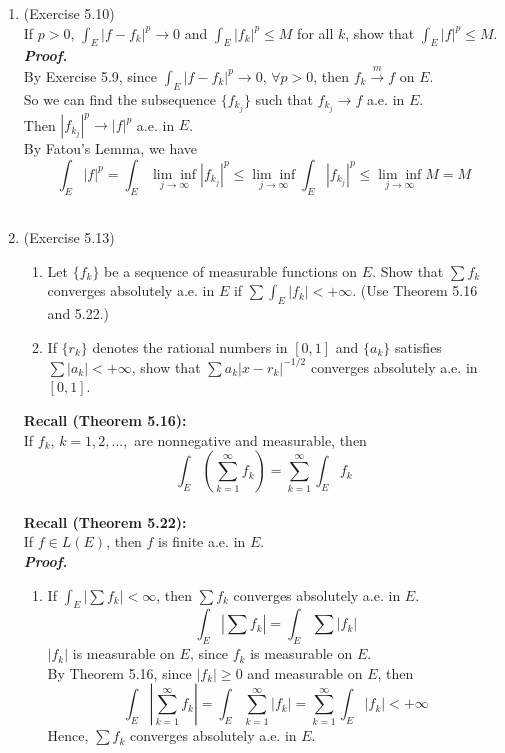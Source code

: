 \documentclass[a4paper,11pt]{article}
\begin{document}
\begin{enumerate}
\item (Exercise 5.10)\\
 If $p > 0$, $\int_{E} |f - f_k|^p \to 0$ and $\int_{E} |f_k|^p \leq M$ for all $k$, show that $\int_{E} |f|^p \leq M$.\\
 \newline
 \textit{\textbf {Proof.}}\\
 By Exercise 5.9, since $\int_{E} |f - f_k|^p \to 0$, $\forall p>0$, then $f_k \overset{m}{\to} f$ on $E$.\\
 So we can find the subsequence $\{ f_{k_j} \}$ such that $f_{k_j} \to f$ a.e. in $E$.\\
 Then $|f_{k_j}|^p \to |f|^p$ a.e. in $E$.\\
 By Fatou's Lemma, we have
 $$\int_{E} |f|^p = \int_{E} \underset{j \to \infty}{\lim \inf} |f_{k_j}|^p \leq \underset{j \to \infty}{\lim \inf} \int_{E} |f_{k_j}|^p \leq \underset{j \to \infty}{\lim \inf} M = M$$\\








\item (Exercise 5.13)
 \begin{enumerate}
 \item Let $\{ f_k \}$ be a sequence of measurable functions on $E$. Show that $\sum f_k$ converges absolutely a.e. in $E$ if $\sum \int_{E} |f_k| < +\infty$. (Use Theorem 5.16 and 5.22.)
 \item If $\{ r_k \}$ denotes the rational numbers in $[0,1]$ and $\{ a_k \}$ satisfies $\sum |a_k| < +\infty$, show that $\sum a_k |x - r_k|^{-1/2}$ converges absolutely a.e. in $[0,1]$.\
 \end{enumerate}
 \textbf{Recall (Theorem 5.16):}\\
 If $f_k$, $k = 1,2,...,$ are nonnegative and measurable, then
 $$\int_{E} \left( \sum_{k=1}^{\infty} f_k \right) = \sum_{k=1}^{\infty} \int_{E} f_k$$\\
 \textbf{Recall (Theorem 5.22):}\\
 If $f \in L(E)$, then $f$ is finite a.e. in $E$.\\
 
 \textit{\textbf {Proof.}}\\
 \begin{enumerate}
 \item
 If $\int_{E} \left| \sum f_k \right| < \infty$, then $\sum f_k$ converges absolutely a.e. in $E$.\\
 $$\int_{E} \left| \sum f_k \right| = \int_{E} \sum |f_k|$$
 $|f_k|$ is measurable on $E$, since $f_k$ is measurable on $E$.\\
 By Theorem 5.16, since $|f_k| \geq 0$ and measurable on $E$, then
 $$\int_{E} \left| \sum_{k=1}^{\infty} f_k \right| = \int_{E} \sum_{k=1}^{\infty} |f_k| = \sum_{k=1}^{\infty} \int_{E} |f_k| < +\infty$$
 Hence, $\sum f_k$ converges absolutely a.e. in $E$.\\


\end{enumerate}
\end{enumerate}
\end{document}
